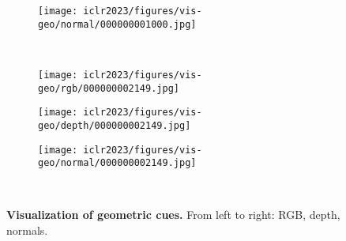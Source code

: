 \documentclass{article} \usepackage{iclr2023_conference,times}
\begin{document}
\begin{figure}
\begin{subfigure}[b]{0.32\textwidth}
         \texttt{[image: iclr2023/figures/vis-geo/normal/000000001000.jpg]}
         \label{fig:five over x}
     \end{subfigure}
     \\
    \begin{subfigure}[b]{0.32\textwidth}
         \centering
         \texttt{[image: iclr2023/figures/vis-geo/rgb/000000002149.jpg]}
         \label{fig:y equals x}
     \end{subfigure}
     \hfill
     \begin{subfigure}[b]{0.32\textwidth}
         \centering
         \texttt{[image: iclr2023/figures/vis-geo/depth/000000002149.jpg]}
         \label{fig:three sin x}
     \end{subfigure}
     \hfill
     \begin{subfigure}[b]{0.32\textwidth}
         \centering
         \texttt{[image: iclr2023/figures/vis-geo/normal/000000002149.jpg]}
         \label{fig:five over x}
     \end{subfigure}
     \\
        \caption{\textbf{Visualization of geometric cues.} From left to right: RGB, depth, normals.}
        \label{fig:geo-vis1}
\end{figure}
\end{document}
